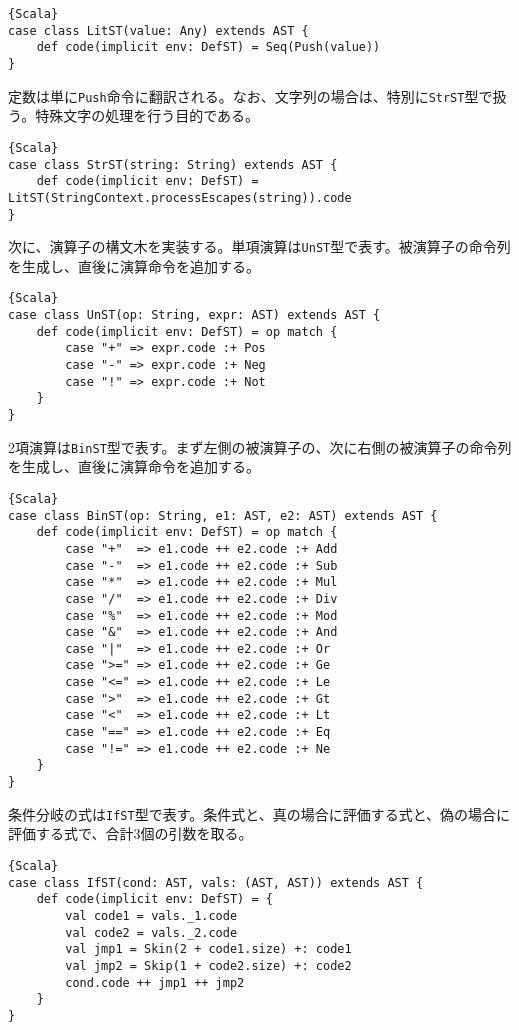 \documentclass[10pt,a4paper]{book}
\begin{document}
\begin{Verbatim}{Scala}
case class LitST(value: Any) extends AST {
	def code(implicit env: DefST) = Seq(Push(value))
}
\end{Verbatim}

定数は単に\texttt{Push}命令に翻訳される。なお、文字列の場合は、特別に\texttt{StrST}型で扱う。特殊文字の処理を行う目的である。

\begin{Verbatim}{Scala}
case class StrST(string: String) extends AST {
	def code(implicit env: DefST) = LitST(StringContext.processEscapes(string)).code
}
\end{Verbatim}

次に、演算子の構文木を実装する。単項演算は\texttt{UnST}型で表す。被演算子の命令列を生成し、直後に演算命令を追加する。

\begin{Verbatim}{Scala}
case class UnST(op: String, expr: AST) extends AST {
	def code(implicit env: DefST) = op match {
		case "+" => expr.code :+ Pos
		case "-" => expr.code :+ Neg
		case "!" => expr.code :+ Not
	}
}
\end{Verbatim}

2項演算は\texttt{BinST}型で表す。まず左側の被演算子の、次に右側の被演算子の命令列を生成し、直後に演算命令を追加する。

\begin{Verbatim}{Scala}
case class BinST(op: String, e1: AST, e2: AST) extends AST {
	def code(implicit env: DefST) = op match {
		case "+"  => e1.code ++ e2.code :+ Add
		case "-"  => e1.code ++ e2.code :+ Sub
		case "*"  => e1.code ++ e2.code :+ Mul
		case "/"  => e1.code ++ e2.code :+ Div
		case "%"  => e1.code ++ e2.code :+ Mod
		case "&"  => e1.code ++ e2.code :+ And
		case "|"  => e1.code ++ e2.code :+ Or
		case ">=" => e1.code ++ e2.code :+ Ge
		case "<=" => e1.code ++ e2.code :+ Le
		case ">"  => e1.code ++ e2.code :+ Gt
		case "<"  => e1.code ++ e2.code :+ Lt
		case "==" => e1.code ++ e2.code :+ Eq
		case "!=" => e1.code ++ e2.code :+ Ne
	}
}
\end{Verbatim}

条件分岐の式は\texttt{IfST}型で表す。条件式と、真の場合に評価する式と、偽の場合に評価する式で、合計3個の引数を取る。

\begin{Verbatim}{Scala}
case class IfST(cond: AST, vals: (AST, AST)) extends AST {
	def code(implicit env: DefST) = {
		val code1 = vals._1.code
		val code2 = vals._2.code
		val jmp1 = Skin(2 + code1.size) +: code1
		val jmp2 = Skip(1 + code2.size) +: code2
		cond.code ++ jmp1 ++ jmp2
	}
}
\end{Verbatim}
\end{document}
